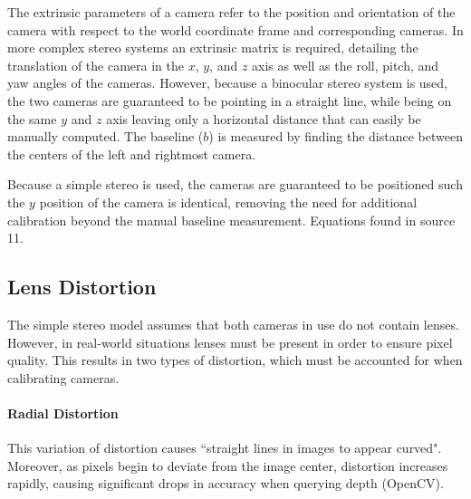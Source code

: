 \documentclass[11pt]{scrartcl}
\begin{document}
The extrinsic parameters of a camera refer to the position and orientation of the camera 
with respect to the world coordinate frame and corresponding cameras. In more complex 
stereo systems an extrinsic matrix is required, detailing the translation of the camera 
in the $x$, $y$, and $z$ axis as well as the roll, pitch, and yaw angles of the cameras. 
However, because a binocular stereo system is used, the two cameras are guaranteed to 
be pointing in a straight line, while being on the same $y$ and $z$ axis leaving only 
a horizontal distance that can easily be manually computed. The baseline ($b$) is measured 
by finding the distance between the centers of the left and rightmost camera. 

\begin{remark}
	Because a simple stereo is used, the cameras are guaranteed to be positioned such the $y$ position of the camera is identical, removing the need for additional calibration beyond the manual baseline measurement. Equations found in source 11. 
\end{remark}

\subsection{Lens Distortion}
The simple stereo model assumes that both cameras in use do not contain lenses. However, in real-world situations lenses must be present in order to ensure pixel quality. This results in two types of distortion, which must be accounted for when calibrating cameras.  
\paragraph{Radial Distortion}
This variation of distortion causes ``straight lines in images to appear curved". Moreover, as pixels begin to deviate from the image center, distortion increases rapidly, causing significant drops in accuracy when querying depth (OpenCV). 
\end{document}
